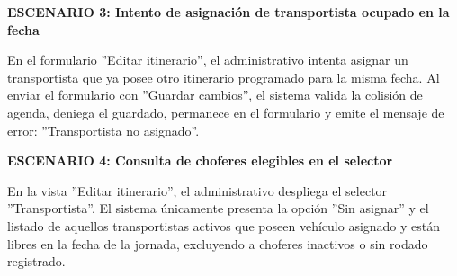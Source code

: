 \documentclass[a4paper,9pt]{article}
\begin{document}
\begin{tcolorbox}
{\noindent\textbf{\textcolor{secondarydark}{ESCENARIO 3:  Intento de asignación de transportista ocupado en la fecha}}\par\vspace{1pt}
En el formulario ''Editar itinerario'', el administrativo intenta asignar un transportista que ya posee otro itinerario programado para la misma fecha. Al enviar el formulario con ''Guardar cambios'', el sistema valida la colisión de agenda, deniega el guardado, permanece en el formulario y emite el mensaje de error: ''Transportista no asignado''.\par\vspace{2.5pt}
\noindent\textbf{\textcolor{secondarydark}{ESCENARIO 4:  Consulta de choferes elegibles en el selector}}\par\vspace{1pt}
En la vista ''Editar itinerario'', el administrativo despliega el selector ''Transportista''. El sistema únicamente presenta la opción ''Sin asignar'' y el listado de aquellos transportistas activos que poseen vehículo asignado y están libres en la fecha de la jornada, excluyendo a choferes inactivos o sin rodado registrado.\par\vspace{2.5pt}
}\par
\end{tcolorbox}
\end{document}
